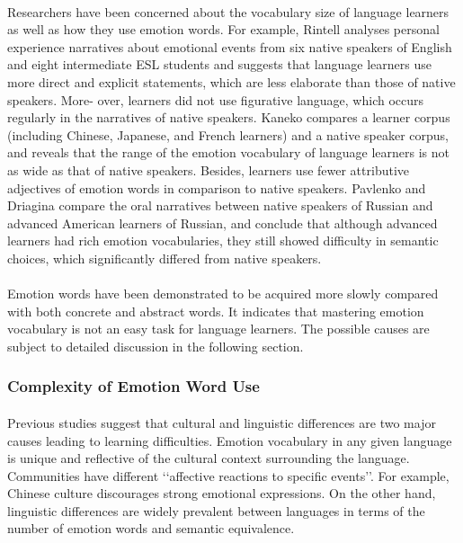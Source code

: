 \documentclass[a4paper,12pt,oneside]{article}
\begin{document}
\paragraph{}
Researchers have been concerned about the vocabulary size of language learners as well as how they use emotion words. For example, Rintell analyses personal experience narratives about emotional events from six native speakers of English and eight intermediate ESL students and suggests that language learners use more direct and explicit statements, which are less elaborate than those of native speakers. More- over, learners did not use figurative language, which occurs regularly in the narratives of native speakers. Kaneko compares a learner corpus (including Chinese, Japanese, and French learners) and a native speaker corpus, and reveals that the range of the emotion vocabulary of language learners is not as wide as that of native speakers. Besides, learners use fewer attributive adjectives of emotion words in comparison to native speakers. Pavlenko and Driagina compare the oral narratives between native speakers of Russian and advanced American learners of Russian, and conclude that although advanced learners had rich emotion vocabularies, they still showed difficulty in semantic choices, which significantly differed from native speakers. 
\paragraph{}
Emotion words have been demonstrated to be acquired more slowly compared with both concrete and abstract words. It indicates that mastering emotion vocabulary is not an easy task for language learners. The possible causes are subject to detailed discussion in the following section. 

\subsubsection{Complexity of Emotion Word Use}
\paragraph{}
Previous studies suggest that cultural and linguistic differences are two major causes leading to learning difficulties. Emotion vocabulary in any given language is unique and reflective of the cultural context surrounding the language. Communities have different ‘‘affective reactions to specific events’’. For example, Chinese culture discourages strong emotional expressions. On the other hand, linguistic differences are widely prevalent between languages in terms of the number of emotion words and semantic equivalence. 
\end{document}
